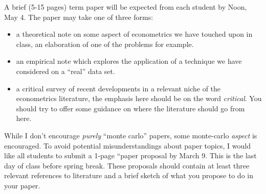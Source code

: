\vspace{5mm}

A brief (5-15 pages) term paper will be expected from each student by 
Noon, May 4.  The paper may take one of three forms:

\begin{itemize}
\item a theoretical note on some aspect of econometrics we have touched upon 
in class, an elaboration of one of the problems for example.

\item an empirical note which explores the application of a technique we have considered on a ``real'' data set.

\item a critical survey of recent developments in a relevant niche of the 
econometrics literature, the emphasis here should be on the word 
{\em critical}.  You should try to offer some guidance on where the literature 
should go from here.
\end{itemize}

While I don't encourage {\em purely} ``monte carlo'' papers, some monte-carlo 
{\em aspect} is encouraged.  To avoid potential misunderstandings about paper
topics, I would like all students to submit a 1-page ``paper proposal by 
March 9.  This is the last day of class before spring break.
These proposals should contain at least three relevant references to 
literature and a brief sketch of what you propose to do in your paper.



